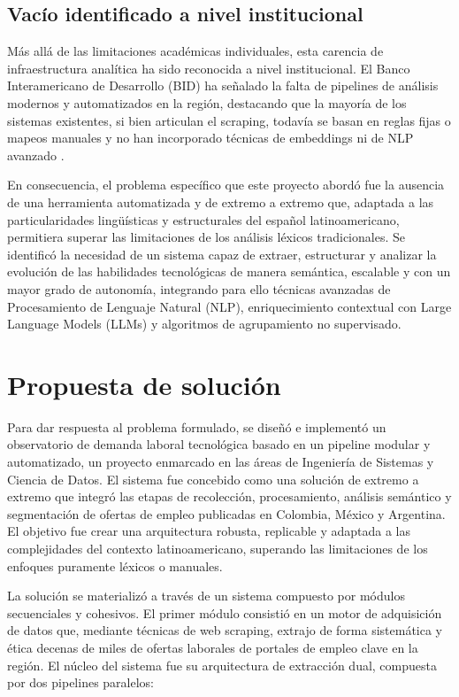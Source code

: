 \subsection{Vacío identificado a nivel institucional}

Más allá de las limitaciones académicas individuales, esta carencia de infraestructura analítica ha sido reconocida a nivel institucional. El Banco Interamericano de Desarrollo (BID) ha señalado la falta de pipelines de análisis modernos y automatizados en la región, destacando que la mayoría de los sistemas existentes, si bien articulan el scraping, todavía se basan en reglas fijas o mapeos manuales y no han incorporado técnicas de embeddings ni de NLP avanzado \cite{echeverria2022}.

En consecuencia, el problema específico que este proyecto abordó fue la ausencia de una herramienta automatizada y de extremo a extremo que, adaptada a las particularidades lingüísticas y estructurales del español latinoamericano, permitiera superar las limitaciones de los análisis léxicos tradicionales. Se identificó la necesidad de un sistema capaz de extraer, estructurar y analizar la evolución de las habilidades tecnológicas de manera semántica, escalable y con un mayor grado de autonomía, integrando para ello técnicas avanzadas de Procesamiento de Lenguaje Natural (NLP), enriquecimiento contextual con Large Language Models (LLMs) y algoritmos de agrupamiento no supervisado.

\section{Propuesta de solución}

Para dar respuesta al problema formulado, se diseñó e implementó un observatorio de demanda laboral tecnológica basado en un pipeline modular y automatizado, un proyecto enmarcado en las áreas de Ingeniería de Sistemas y Ciencia de Datos. El sistema fue concebido como una solución de extremo a extremo que integró las etapas de recolección, procesamiento, análisis semántico y segmentación de ofertas de empleo publicadas en Colombia, México y Argentina. El objetivo fue crear una arquitectura robusta, replicable y adaptada a las complejidades del contexto latinoamericano, superando las limitaciones de los enfoques puramente léxicos o manuales.

La solución se materializó a través de un sistema compuesto por módulos secuenciales y cohesivos. El primer módulo consistió en un motor de adquisición de datos que, mediante técnicas de web scraping, extrajo de forma sistemática y ética decenas de miles de ofertas laborales de portales de empleo clave en la región. El núcleo del sistema fue su arquitectura de extracción dual, compuesta por dos pipelines paralelos:

